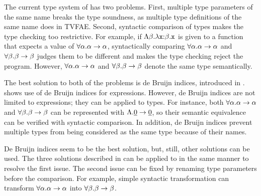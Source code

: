 The current type system of \lang has two problems. First, multiple type
parameters of the same name breaks the type soundness, as multiple type
definitions of the same name does in \textsf{TVFAE}. Second, syntactic
comparison of types makes the type checking too restrictive. For example, if
$\Lambda\beta.\lambda\texttt{x}{:}\beta.\texttt{x}$ is given to a function
that expects a value of $\forall\alpha.\alpha\rightarrow\alpha$, syntactically comparing
$\forall\alpha.\alpha\rightarrow\alpha$ and $\forall\beta.\beta\rightarrow\beta$ judges them to be
different and makes the type checking reject the program. However,
$\forall\alpha.\alpha\rightarrow\alpha$ and $\forall\beta.\beta\rightarrow\beta$ denote the same type
semantically.

The best solution to both of the problems is de Bruijn indices, introduced in
.
 shows use of de Bruijn indices for
expressions. However, de Bruijn indices are not limited to expressions; they
can be applied to types. For instance, both $\forall\alpha.\alpha\rightarrow\alpha$
and $\forall\beta.\beta\rightarrow\beta$ can be represented with
$\Lambda.\underline{0}\rightarrow\underline{0}$, so their semantic equivalence
can be verified with syntactic comparison. In addition, de Bruijn indices
prevent multiple types from being considered as the same type because of their
names.

De Bruijn indices seem to be the best solution, but, still, other solutions can
be used. The three solutions described in  can be
applied to \lang in the same manner to resolve the first issue. The second issue
can be fixed by renaming type parameters before the comparison. For example, simple syntactic
transformation can transform $\forall\alpha.\alpha\rightarrow\alpha$
into $\forall\beta.\beta\rightarrow\beta$.





